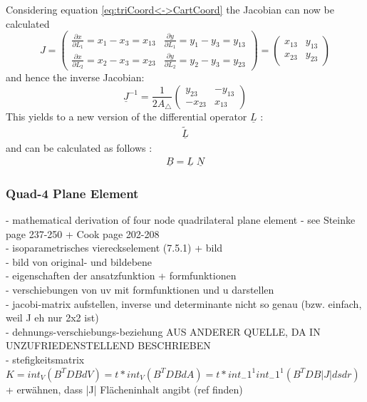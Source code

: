 \documentclass[11pt,twoside]{scrartcl}
\begin{document}
  Considering equation \ref{eq:triCoord<->CartCoord} the Jacobian can now be calculated
  \begin{equation}
  J = \begin{pmatrix}
  \frac{\partial x}{\partial L_1} = x_1-x_3 = x_{13} & \frac{\partial y}{\partial L_1} = y_1-y_3 = y_{13}\\
  \frac{\partial x}{\partial L_2} = x_2-x_3 = x_{23} & \frac{\partial y}{\partial L_2} = y_2-y_3 = y_{23}
  \end{pmatrix} = \begin{pmatrix}
  x_{13} & y_{13}\\
  x_{23} & y_{23}
  \end{pmatrix}
  \end{equation}
  and hence the inverse Jacobian:
  \begin{equation}
  \underline{J}^{-1} = \frac{1}{2 A_\triangle} \begin{pmatrix}
  y_{23} & -y_{13}\\
  -x_{23} & x_{13}
  \end{pmatrix}
  \end{equation}
  This yields to a new version of the differential operator $\underline{L}$ \cite{steinke2005finite}:
  \begin{align}
  \underline{\tilde{L}}
  \end{align}
   and can be calculated as follows \cite{steinke2005finite}:
  \begin{align}
  \underline{B} = \underline{L}\; \underline{N}
  \end{align}
  \subsubsection{Quad-4 Plane Element}
  - mathematical derivation of four node quadrilateral plane element\newline
  - see Steinke \cite{steinke2005finite} page 237-250 + Cook \cite{cook2002concepts} page 202-208\\
  - isoparametrisches viereckselement (7.5.1) + bild\\
  - bild von original- und bildebene\\
  - eigenschaften der ansatzfunktion + formfunktionen\\
  - verschiebungen von uv mit formfunktionen und u darstellen\\
  - jacobi-matrix aufstellen, inverse und determinante nicht so genau (bzw. einfach, weil J eh nur 2x2 ist)\\
  - dehnungs-verschiebungs-beziehung AUS ANDERER QUELLE, DA IN \cite{steinke2005finite} UNZUFRIEDENSTELLEND BESCHRIEBEN\\
  - stefigkeitsmatrix $K = int_V(B^TDBdV) = t*int_V(B^TDBdA) = t*int_-1^1 int_-1^1(B^TDB|J|dsdr)$ + erwähnen, dass |J| Flächeninhalt angibt (ref finden)
\end{document}
